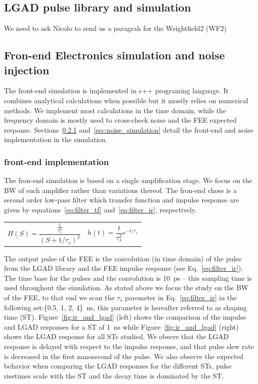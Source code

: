 \documentclass[preprint,1p]{elsarticle}
\begin{document}
\subsection{LGAD pulse library and simulation}
\label{sub_sec:lgad_pulse_library}
We need to ask Nicolo to send us a paragrah for the Weightfield2 (WF2)

\subsection{Fron-end Electronics simulation and noise injection}
\label{sub_sec:fee_simulation_and_noise}
The front-end simulation is implemented in c++ programing language. It combines analytical calculations when possible but
it mostly relies on numerical methods. We implement most calculations in the time domain, while the frequency domain is mostly used
to cross-check noise and the FEE expected response. Sections~\ref{sec:fee} and~\ref{sec:noise_simulation} detail the front-end and
noise implementation in the simulation.

\subsubsection{front-end implementation}\label{sec:fee}
The fron-end simulation is based on a single amplification stage. We focus on the BW of such amplifier rather than variations
thereof. The fron-end chose is a second order low-pass filter which transfer function
and impulse response are given by equations~\ref{eq:filter_tf} and~\ref{eq:filter_ir}, respectively.


 \begin{tabularx}{\textwidth}{XX}
 \begin{equation}\label{eq:filter_tf}
   H(S) = \frac{\frac{1}{\tau_{s}^{2}}}{(S+1/\tau_{s})^{2}}
 \end{equation}
     &
 \begin{equation}\label{eq:filter_ir}
     h(t) = \frac{t}{\tau_s^2}e^{-t/\tau_{s}}
 \end{equation}
 \end{tabularx}\par

 The output pulse of the FEE is the convolution (in time domain) of the pulse from the LGAD library and the FEE impulse response
 (see Eq.~\ref{eq:filter_ir}).
 The time base for the pulses and the convolution is 10~\si{ps} -- this sampling time is used throughout the simulation. As stated above we focus the study
 on the BW of the FEE, to that end we scan the $\tau_{s}$ paremeter in Eq.~\ref{eq:filter_ir} in the following set:\{0.5, 1, 2, 4\}~\si{ns}, this parameter is hereafter referred to as
 shaping time (ST). Figure~\ref{fig:ir_and_lgad} (left) shows the comparison of the impulse and LGAD responses for a ST of 1~\si{ns} while
 Figure~\ref{fig:ir_and_lgad} (right) shows the LGAD response for all STs studied. We obseve that the LGAD response is delayed with respect
 to the impulse response,  and that pulse slew rate is decreased in the first nanosecond of the pulse. We also observe the expected
 behavior when comparing the LGAD responses for the different STs, pulse risetimes scale with the ST and the decay time is dominated by
 the ST.
\end{document}
